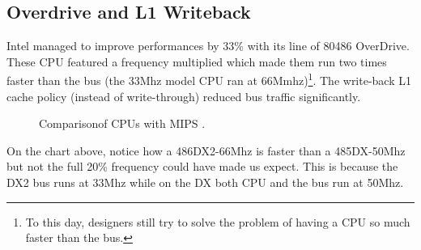 \subsection{Overdrive and L1 Writeback}
Intel managed to improve performances by 33\% with its line of 80486 OverDrive. These CPU featured a frequency multiplied which made them run two times faster than the bus (the 33Mhz model CPU ran at 66Mmhz)\footnote{To this day, designers still try to solve the problem of having a CPU so much faster than the bus.}.  The write-back L1 cache policy (instead of write-through) reduced bus traffic significantly.\\
\par 
{}%
\par

\begin{figure}[H]
\centering
   \caption{Comparison\protect\footnotemark of CPUs with MIPS \protect\footnotemark.}
 \end{figure}
\par
On the chart above, notice how a 486DX2-66Mhz is faster than a 485DX-50Mhz but not the full 20\% frequency could have made us expect. This is because the DX2 bus runs at 33Mhz while on the DX both CPU and the bus run at 50Mhz.





